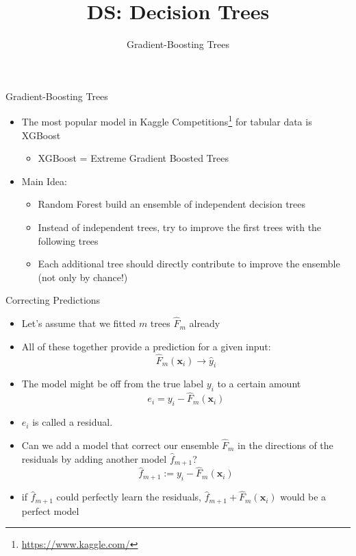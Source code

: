 \documentclass[aspectratio=169]{../latex_main/tntbeamer}  %
\title[Gradient-Boosting Trees]{DS: Decision Trees}
\subtitle{Gradient-Boosting Trees}
\begin{document}
	
	\maketitle
	\begin{frame}[c]{Gradient-Boosting Trees}

    \begin{itemize}
        \item The most popular model in Kaggle Competitions\footnote{\url{https://www.kaggle.com/}} for tabular data is XGBoost
        \begin{itemize}
            \item XGBoost = Extreme Gradient Boosted Trees
        \end{itemize}
        \smallskip
        \item Main Idea:
        \begin{itemize}
            \item Random Forest build an ensemble of independent decision trees
            \item Instead of independent trees, try to improve the first trees with the following trees
            \item Each additional tree should directly contribute to improve the ensemble (not only by chance!)
        \end{itemize}
    \end{itemize}

	\end{frame}
	
	\begin{frame}[c]{Correcting Predictions}

    \vspace{-1em}
    \begin{itemize}
        \item Let's assume that we fitted $m$ trees $\hat{F}_m$ already
        \item All of these together provide a prediction for a given input:
        $$ \hat{F}_m(\bm{x}_i) \to \hat{y}_i $$
        \smallskip
        \item The model might be off from the true label $y_i$ to a certain amount
        $$e_i = y_i - \hat{F}_m(\bm{x}_i)$$
        \item $e_i$ is called a residual.
        \smallskip
        \item Can we add a model that correct our ensemble $\hat{F}_m$ in the directions of the residuals by adding another model $\hat{f}_{m+1}$?
        $$ \hat{f}_{m+1} :=  y_i - \hat{F}_m(\bm{x}_i)$$ 
        \item if $ \hat{f}_{m+1}$ could perfectly learn the residuals, $\hat{f}_{m+1} +  \hat{F}_m(\bm{x}_i)$ would be a perfect model
    \end{itemize}

	\end{frame}
	
\end{document}
